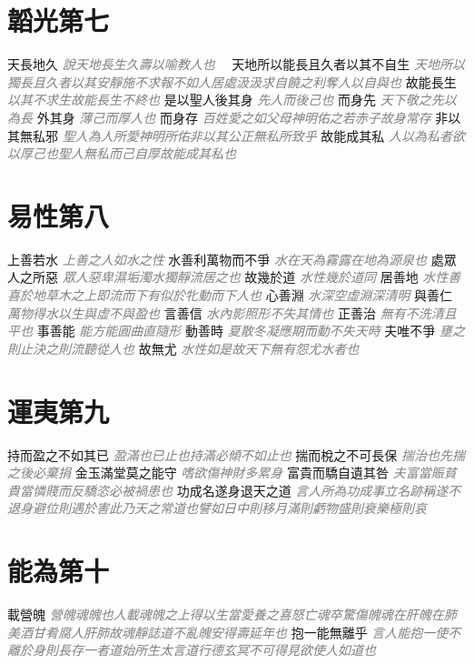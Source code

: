 \documentclass[a4paper,zihao=-4,oneside,landscape,UTF8]{ctexart}
\newcommand{\zhushi}[1]{\scriptsize{\textit{\textcolor{gray}{#1}}}\normalsize}
\begin{document}
\section{韜光第七}

天長地久
\zhushi{說天地長生久壽以喻教人也　}
天地所以能長且久者以其不自生
\zhushi{天地所以獨長且久者以其安靜施不求報不如人居處汲汲求自饒之利奪人以自與也}
故能長生
\zhushi{以其不求生故能長生不終也}
是以聖人後其身
\zhushi{先人而後己也}
而身先
\zhushi{天下敬之先以為長}
外其身
\zhushi{薄己而厚人也}
而身存
\zhushi{百姓愛之如父母神明佑之若赤子故身常存}
非以其無私邪
\zhushi{聖人為人所愛神明所佑非以其公正無私所致乎}
故能成其私
\zhushi{人以為私者欲以厚己也聖人無私而己自厚故能成其私也}


\section{易性第八}

上善若水
\zhushi{上善之人如水之性}
水善利萬物而不爭
\zhushi{水在天為霧露在地為源泉也}
處眾人之所惡
\zhushi{眾人惡卑濕垢濁水獨靜流居之也}
故幾於道
\zhushi{水性幾於道同}
居善地
\zhushi{水性善喜於地草木之上即流而下有似於牝動而下人也}
心善淵
\zhushi{水深空虛淵深清明}
與善仁
\zhushi{萬物得水以生與虛不與盈也}
言善信
\zhushi{水內影照形不失其情也}
正善治
\zhushi{無有不洗清且平也}
事善能
\zhushi{能方能圓曲直隨形}
動善時
\zhushi{夏散冬凝應期而動不失天時}
夫唯不爭
\zhushi{壅之則止決之則流聽從人也}
故無尤
\zhushi{水性如是故天下無有怨尤水者也}


\section{運夷第九}

持而盈之不如其已
\zhushi{盈滿也已止也持滿必傾不如止也}
揣而梲之不可長保
\zhushi{揣治也先揣之後必棄捐}
金玉滿堂莫之能守
\zhushi{嗜欲傷神財多累身}
富貴而驕自遺其咎
\zhushi{夫富當賑貧貴當憐賤而反驕恣必被禍患也}
功成名遂身退天之道
\zhushi{言人所為功成事立名跡稱遂不退身避位則遇於害此乃天之常道也譬如日中則移月滿則虧物盛則衰樂極則哀}


\section{能為第十}

載營魄
\zhushi{營魄魂魄也人載魂魄之上得以生當愛養之喜怒亡魂卒驚傷魄魂在肝魄在肺美酒甘肴腐人肝肺故魂靜誌道不亂魄安得壽延年也}
抱一能無離乎
\zhushi{言人能抱一使不離於身則長存一者道始所生太言道行德玄冥不可得見欲使人如道也}
\end{document}
